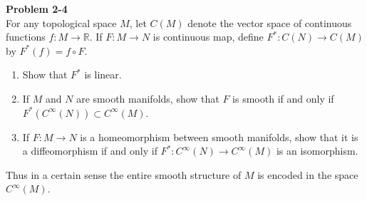 \documentclass[12pt, a4paper]{article}
\theoremstyle{plain}
\newcommand{\R}{\mathbb{R}}
\newenvironment{problem}[2][Problem]
    { \begin{mdframed}[backgroundcolor=gray!20] \textbf{#1 #2} \\}
    {  \end{mdframed}}
\begin{document}
\begin{problem}{2-4}
    For any topological space $M$, let $C(M)$ denote the vector space of continuous functions $f\colon M\to \R$. If $F\colon M\to N$ is continuous map, define $F^*\colon C(N)\to C(M)$ by $F^*(f)= f\circ F$.
    \begin{enumerate}[label=(\alph*)]
        \item Show that $F^*$ is linear.
        \item If $M$ and $N$ are smooth manifolds, show that $F$ is smooth if and only if $F^*(C^\infty(N))\subset C^\infty(M)$.
        \item If $F\colon M\to N$ is a homeomorphism between smooth manifolds, show that it is a diffeomorphism if and only if $F^*\colon C^{\infty}(N)\to C^{\infty}(M)$ is an isomorphism. 
    \end{enumerate}
    Thus in a certain sense the entire smooth structure of $M$ is encoded in the space $C^{\infty}(M)$.
\end{problem}
\end{document}
